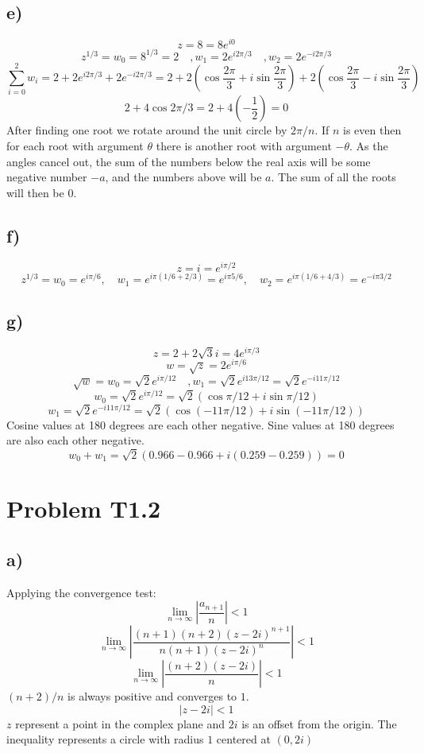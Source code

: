 \documentclass{article}
\begin{document}
\subsection*{e)}
\[
z = 8 = 8e^{i0} 
\]
\[
z^{1 / 3} = w_0 = 8^{1 / 3} = 2 \quad , w_1 = 2e^{i2π / 3} \quad , w_2 = 2e^{-i2π / 3}
\]
\[
∑_{i=0}^{2} w_i = 2 + 2e^{i2π / 3} + 2e^{-i2π / 3} = 2 + 2\left(\cos \frac{2π}{3} + i \sin \frac{2π}{3}\right) + 2\left(\cos \frac{2π}{3} - i \sin \frac{2π}{3}\right) 
\]
\[
2 + 4 \cos 2π / 3 = 2 + 4 \left(-\frac{1}{2}\right) = 0
\]
After finding one root we rotate around the unit circle by $2π / n$. If $n$ is even then for each root with argument $θ$ there is another root with argument $-θ$. As the angles cancel out, the sum of the numbers below the real axis will be some negative number $-a$, and the numbers above will be $a$. The sum of all the roots will then be $0$. 


\subsection*{f)}
\[
z = i = e^{iπ / 2}
\]
\[
z^{1 / 3} = w_0 = e^{iπ / 6}, \quad w_1 = e^{iπ (1 / 6 + 2 / 3)} = e^{iπ 5 / 6}, \quad w_2 = e^{iπ (1 / 6 + 4 / 3)} = e^{- iπ 3 / 2}
\]

\subsection*{g)}
\[
z = 2 + 2\sqrt{3}i = 4e^{iπ / 3}
\]
\[
w = \sqrt{z} = 2e^{iπ / 6}
\]
\[
\sqrt{w} = w_0 = \sqrt{2}e^{i π / 12} \quad , w_1 = \sqrt{2}e^{i 13π / 12} = \sqrt{2}e^{- i 11π / 12}
\]
\[
w_0 = \sqrt{2}e^{i π / 12} = \sqrt{2} \left(\cos π / 12 + i\sin π / 12\right)
\]
\[
w_1 = \sqrt{2}e^{-i 11π / 12} = \sqrt{2} \left(\cos (-11π / 12) + i \sin \left(-11 π / 12\right)\right)
\]
Cosine values at 180 degrees are each other negative. Sine values at 180 degrees are also each other negative. 
\[
w_0 + w_1 = \sqrt{2} \left(0.966 - 0.966 +  i(0.259 - 0.259)\right) = 0
\]

\section*{Problem T1.2}
\subsection*{a)}
Applying the convergence test:
\[
\lim_{n \to ∞} \left|\frac{a_{n+1}}{n}\right| < 1
\]
\[
\lim_{n \to ∞} \left|\frac{(n+1)(n+2)(z-2i)^{n+1}}{n(n+1)(z-2i)^{n}}\right| < 1
\]
\[
\lim_{n \to ∞} \left|\frac{(n+2) (z - 2i)}{n}\right| < 1
\]
$(n+2) / n$ is always positive and converges to $1$. 
\[
\left|z - 2i\right| < 1
\]
$z$ represent a point in the complex plane and $2i$ is an offset from the origin. The inequality represents a circle with radius $1$ centered at $(0, 2i)$
\end{document}
